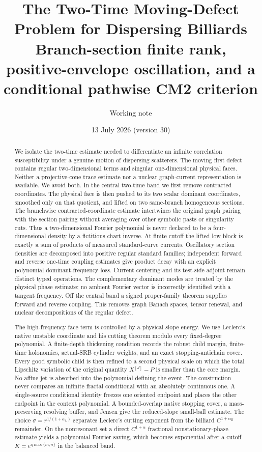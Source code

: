 \documentclass[11pt]{article}
\title{The Two-Time Moving-Defect Problem for Dispersing Billiards\\
\large Branch-section finite rank, positive-envelope oscillation, and a conditional
pathwise CM2 criterion}
\author{Working note}
\date{13 July 2026 (version 30)}
\begin{document}
\maketitle

\begin{abstract}
We isolate the two-time estimate needed to differentiate an infinite
correlation susceptibility under a genuine motion of dispersing scatterers.
The moving first defect contains regular two-dimensional terms and singular
one-dimensional physical faces.  Neither a projective-cone trace estimate nor
a nuclear graph-current representation is available.  We avoid both.  In the
central two-time band we first remove contracted coordinates.  The physical
face is then pushed to its two scalar dominant coordinates, smoothed only on
that quotient, and lifted on two same-branch homogeneous sections.  The
branchwise contracted-coordinate estimate intertwines the original graph
pairing with the section pairing without averaging over other symbolic pasts
or singularity cuts.  Thus a two-dimensional Fourier polynomial is never
declared to be a four-dimensional density by a fictitious chart inverse.  At
finite cutoff the lifted low block is exactly a sum of products of measured
standard-curve currents.  Oscillatory section densities are decomposed into
positive regular standard families; independent forward and reverse
one-time coupling estimates give product decay with an explicit polynomial
dominant-frequency loss.  Current centering and its test-side adjoint remain
distinct typed operations.  The complementary dominant
modes are treated by the physical phase estimate; no ambient Fourier vector is
incorrectly identified with a tangent frequency.  Off the
central band a signed proper-family theorem supplies forward and reverse
coupling.  This removes graph Banach spaces, tensor renewal, and nuclear
decompositions of the regular defect.

The high-frequency face term is controlled by a physical slope energy.  We
use Leclerc's native unstable coordinate and his cutting theorem modulo every
fixed-degree polynomial.  A finite-depth thickening condition records the
robust child margin, finite-time holonomies, actual-SRB cylinder weights, and
an exact stopping-antichain cover.  Every good symbolic child is then refined
to a second physical scale on which the total Lipschitz variation of the
original quantity $X^{[J]}-P$ is smaller than the core margin.  No affine jet
is absorbed into the polynomial defining the event.  The construction never compares
an infinite fractal conditional with an absolutely continuous one.  A single-source
conditional identity freezes one oriented endpoint and places the other
endpoint in the context polynomial.  A bounded-overlap native stopping cover, a mass-preserving
resolving buffer, and Jensen give the reduced-slope small-ball estimate.  The
choice $\sigma=r^{1/(1+\alpha_L)}$ separates Leclerc's cutting exponent from
the billiard $C^{1+\alpha_B}$ remainder.  On the nonresonant set a direct
$C^{1+\alpha}$ fractional nonstationary-phase estimate yields a polynomial
Fourier saving, which becomes exponential after a cutoff
$K=e^{\eta\max\{m,n\}}$ in the balanced band.


\end{abstract}
\end{document}
